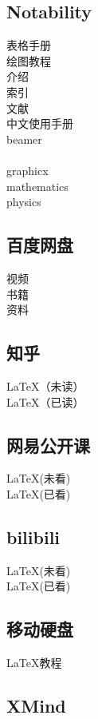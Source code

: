 \documentclass{book}%
\begin{document}
	\subsection{Notability}
	表格手册\\
	绘图教程\\
	介绍\\
	索引\\
	文献\\
	中文使用手册\\
	beamer\\
	\CTeX\\
	graphicx\\
	mathematics\\
	physics\\
	
	\subsection{百度网盘}
	视频\\
	书籍\\
	资料\\
	
	\subsection{知乎}
	LaTeX（未读）\\
	LaTeX（已读）\\
	
	\subsection{网易公开课}
	LaTeX(未看)\\
	LaTeX(已看)\\
	
	
	\subsection{bilibili}
	LaTeX(未看)\\
	LaTeX(已看)\\
	
	\subsection{移动硬盘}
	\LaTeX 教程\\

    \subsection{XMind}
    
\end{document}
